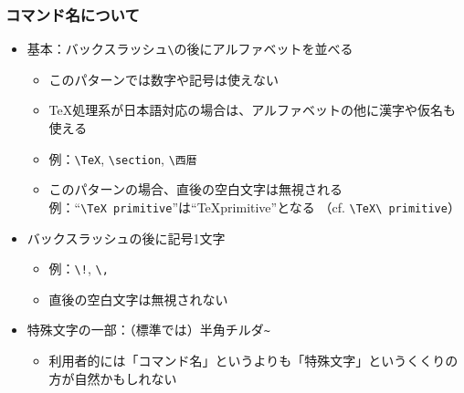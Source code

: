\documentclass[aspectratio=169]{beamer}
\newcommand\cmdname[1]{\texttt{\textbackslash #1}}
\begin{document}
\begin{frame}[fragile]\frametitle{コマンド名について}
  \begin{itemize}
  \item 基本：バックスラッシュ\texttt{\textbackslash}の後にアルファベットを並べる
    \begin{itemize}
    \item このパターンでは数字や記号は使えない
    \item \TeX 処理系が日本語対応の場合は、アルファベットの他に漢字や仮名も使える
    \item 例：\cmdname{TeX}, \cmdname{section}, \cmdname{西暦}
    \item このパターンの場合、直後の空白文字は無視される \\
      例：``\lstinline!\TeX primitive!''は``\TeX primitive''となる
      （cf. \lstinline!\TeX\ primitive!）
    \end{itemize}
  \item バックスラッシュの後に記号1文字
    \begin{itemize}
    \item 例：\lstinline+\!+, \lstinline+\,+
    \item 直後の空白文字は無視されない
    \end{itemize}
  \item 特殊文字の一部：（標準では）半角チルダ\lstinline+~+
    \begin{itemize}
    \item 利用者的には「コマンド名」というよりも「特殊文字」というくくりの方が自然かもしれない
    \end{itemize}
  \end{itemize}
\end{frame}
\end{document}
